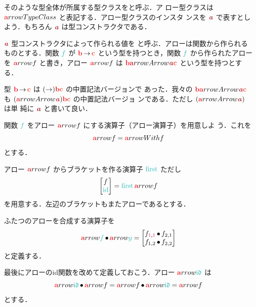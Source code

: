 \documentclass[a5paper,twoside,fleqn,draft]{jsbook}
\begin{document}
そのような型全体が所属する型クラスをと呼ぶ．ア
ロー型クラスは $\hTypeName{a}rrowTypeClass$ と表記する．アロー型クラスのインスタ
ンスを $\mTypeConstructor{a}$ で表すとしよう．もちろん
$\mTypeConstructor{a}$ は型コンストラクタである．

$\mTypeConstructor{a}$ 型コンストラクタによって作られる値を
と呼ぶ．アローは関数から作られるものとする．関数 $\hFunc{f}$
が $\hTypeName{b}\hFunctionArrow\mC$ という型を持つとき，関数 $\hFunc{f}$ から作られたアロー
を $\hTypeName{a}rrow{f}$ と書き，アロー $\hTypeName{a}rrow{f}$ は
$\hTypeName{b}\hTypeName{a}rrowArrow{\mTypeConstructor{a}}\mC$ という型を持つとす
る．

型 $\hTypeName{b}\hFunctionArrow\mC$ は $(\hFunctionArrow)\hTypeName{b}\mC$ の中置記法バージョンで
あった．我々の $\hTypeName{b}\hTypeName{a}rrowArrow{\mTypeConstructor{a}}\mC$ も
$(\hTypeName{a}rrowArrow{\mTypeConstructor{a}})\hTypeName{b}\mC$ の中置記法バージョ
ンである．ただし $(\hTypeName{a}rrowArrow{\mTypeConstructor{a}})$ は単
純に $\mTypeConstructor{a}$ と書いて良い．

\separator

関数 $\hFunc{f}$ をアロー $\hTypeName{a}rrow{f}$ にする演算子（アロー演算子）を用意しよ
う．これを
\begin{equation}
  \hTypeName{a}rrow{f}
  =\hTypeName{a}rrowWith{f}
\end{equation}
とする．

アロー $\hTypeName{a}rrow{f}$ からブラケットを作る演算子 $\mFirst$ ただし
\begin{equation}
  \begin{bmatrix}
    f\\
    \mId
  \end{bmatrix}
  =
  \mFirst\hTypeName{a}rrow{f}
\end{equation}
を用意する．左辺のブラケットもまたアローであるとする．

ふたつのアローを合成する演算子を
\begin{equation}
  \hTypeName{a}rrow{\hFunc{f}}\mCompCat\hTypeName{a}rrow{\hFunc{g}}
  =
  \begin{bmatrix}
    f_{\hConstant{1},\hConstant{1}}\hCompose f_{2,1}\\
    f_{1,2}\hCompose f_{2,2}
  \end{bmatrix}
\end{equation}
と定義する．

最後にアローのid関数を改めて定義しておこう．アロー $\hTypeName{a}rrow{\mIdCat}$
は
\begin{equation}
  \hTypeName{a}rrow{\mIdCat}\mCompCat\hTypeName{a}rrow{f}
  =\hTypeName{a}rrow{f}\mCompCat\hTypeName{a}rrow{\mIdCat}
  =\hTypeName{a}rrow{f}
\end{equation}
とする．
\end{document}
